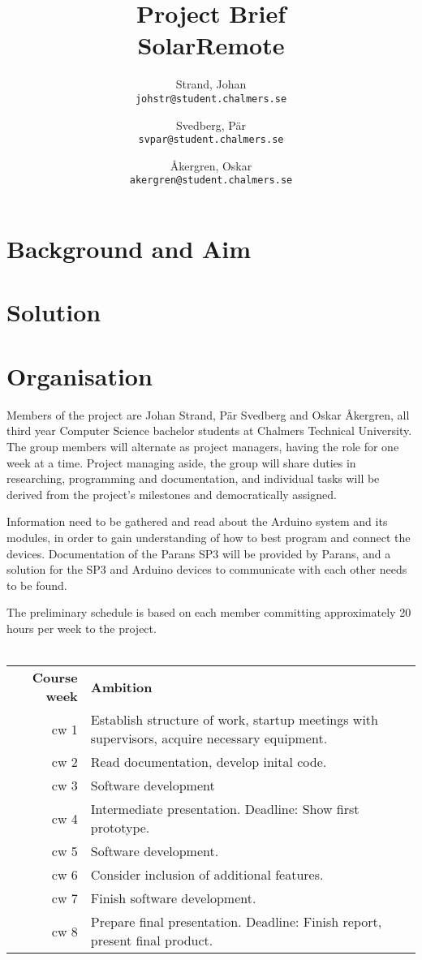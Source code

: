 \documentclass[a4paper]{article}
\author{	Strand, Johan \\ \texttt{johstr@student.chalmers.se} \and
			Svedberg, Pär\\ \texttt{svpar@student.chalmers.se} \and
			Åkergren, Oskar\\ \texttt{akergren@student.chalmers.se}
}
\title{\vspace{-3cm} Project Brief  \\ SolarRemote}
\begin{document}
	\maketitle
	\section*{Background and Aim} %
	\label{sec:background_and_aim}
	
	\section*{Solution} %
	\label{sec:solution}
	
	\section*{Organisation} %
	\label{sec:organisation}
		Members of the project are Johan Strand, Pär Svedberg and Oskar Åkergren, all third year Computer Science bachelor students at Chalmers Technical University. The group members will alternate as project managers, having the role for one week at a time. Project managing aside, the group will share duties in researching, programming and documentation, and individual tasks will be derived from the project's milestones and democratically assigned.

		Information need to be gathered and read about the Arduino system and its modules, in order to gain understanding of how to best program and connect the devices. Documentation of the Parans SP3 will be provided by Parans, and a solution for the SP3 and Arduino devices to communicate with each other needs to be found.
		
		The preliminary schedule is based on each member committing approximately 20 hours per week to the project.
		\\ \\
		\noindent\begin{tabularx}{\textwidth}{@{}rX}
			\textbf{Course week} & \textbf{Ambition}\\
			cw 1 & Establish structure of work, startup meetings with supervisors, acquire necessary equipment. \\
			cw 2 & Read documentation, develop inital code. \\
			cw 3 & Software development \\
			cw 4 & Intermediate presentation. Deadline: Show first prototype. \\
			cw 5 & Software development. \\
			cw 6 & Consider inclusion of additional features. \\
			cw 7 & Finish software development. \\
			cw 8 & Prepare final presentation. Deadline: Finish report, present final product. \\
		\end{tabularx}
\end{document}
